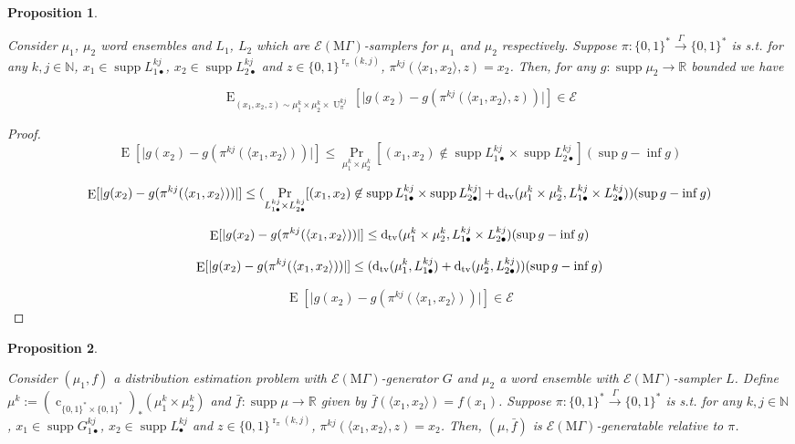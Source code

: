 \documentclass{article}
\numberwithin{equation}{section}
\theoremstyle{definition}
\theoremstyle{plain}
\newtheorem{proposition}{Proposition}[section]
\newcommand{\Bool}{\{0,1\}}
\newcommand{\Words}{{\Bool^*}}
\DeclareMathOperator{\Supp}{supp}
\DeclareMathOperator{\Prb}{Pr}
\DeclareMathOperator{\E}{E}
\DeclareMathOperator{\R}{r}
\DeclareMathOperator{\U}{U}
\DeclareMathOperator{\En}{c}
\newcommand{\Dtv}{\operatorname{d}_{\textnormal{tv}}}
\newcommand{\Nats}{\mathbb{N}}
\newcommand{\Reals}{\mathbb{R}}
\newcommand{\Abs}[1]{\lvert #1 \rvert}
\newcommand{\Chev}[1]{\langle #1 \rangle}
\newcommand{\MGrow}{\mathrm{M}\Gamma}
\newcommand{\Fall}{\mathcal{E}}
\newcommand{\Scheme}{\xrightarrow{\Gamma}}
\begin{document}
\begin{samepage}
\begin{proposition}
\label{prp:tbd}

Consider $\mu_1$, $\mu_2$ word ensembles and $L_1$, $L_2$ which are $\Fall(\MGrow)$-samplers for $\mu_1$ and $\mu_2$ respectively. Suppose $\pi: \Words \Scheme \Words$ is s.t. for any $k,j \in \Nats$, $x_1 \in \Supp L_{1\bullet}^{kj}$, ${x_2 \in \Supp L_{2\bullet}^{kj}}$ and $z \in \Bool^{\R_\pi(k,j)}$, $\pi^{kj}(\Chev{x_1,x_2},z)=x_2$. Then, for any $g: \Supp \mu_2 \rightarrow \Reals$ bounded we have 

$$\E_{(x_1,x_2,z) \sim\mu_1^k \times \mu_2^k \times \U_\pi^{kj}}[\Abs{g(x_2)-g(\pi^{kj}(\Chev{x_1,x_2},z))}] \in \Fall$$

\end{proposition}
\end{samepage}

\begin{proof}

$$\E[\Abs{g(x_2)-g(\pi^{kj}(\Chev{x_1,x_2}))}] \leq \Prb_{ \mu_1^k \times \mu_2^k}[(x_1,x_2) \not\in \Supp L_{1\bullet}^{kj} \times \Supp L_{2\bullet}^{kj}] (\sup g - \inf g)$$

$$\E[\Abs{g(x_2)-g(\pi^{kj}(\Chev{x_1,x_2}))}] \leq (\Prb_{ L_{1\bullet}^{kj} \times L_{2\bullet}^{kj}}[(x_1,x_2) \not\in \Supp L_{1\bullet}^{kj} \times \Supp L_{2\bullet}^{kj}]+\Dtv(\mu_1^k \times \mu_2^k,L_{1\bullet}^{kj} \times L_{2\bullet}^{kj})) (\sup g - \inf g)$$

$$\E[\Abs{g(x_2)-g(\pi^{kj}(\Chev{x_1,x_2}))}] \leq \Dtv(\mu_1^k \times \mu_2^k,L_{1\bullet}^{kj} \times L_{2\bullet}^{kj}) (\sup g - \inf g)$$

$$\E[\Abs{g(x_2)-g(\pi^{kj}(\Chev{x_1,x_2}))}] \leq (\Dtv(\mu_1^k,L_{1\bullet}^{kj})+\Dtv(\mu_2^k,L_{2\bullet}^{kj})) (\sup g - \inf g)$$

$$\E[\Abs{g(x_2)-g(\pi^{kj}(\Chev{x_1,x_2}))}] \in \Fall$$

\end{proof}

\begin{samepage}
\begin{proposition}
\label{prp:tbd}

Consider $(\mu_1, f)$ a distribution estimation problem with $\Fall(\MGrow)$-generator $G$ and $\mu_2$ a word ensemble with $\Fall(\MGrow)$-sampler $L$. Define ${\mu^k:=(\En_{\Words \times \Words})_*(\mu_1^k \times \mu_2^k)}$ and $\bar{f}: \Supp \mu \rightarrow \Reals$ given by $\bar{f}(\Chev{x_1,x_2})=f(x_1)$. Suppose $\pi: \Words \Scheme \Words$ is s.t. for any $k,j \in \Nats$, $x_1 \in \Supp G_{1\bullet}^{kj}$, ${x_2 \in \Supp L_\bullet^{kj}}$ and $z \in \Bool^{\R_\pi(k,j)}$, $\pi^{kj}(\Chev{x_1,x_2},z)=x_2$. Then, $(\mu,\bar{f})$ is $\Fall(\MGrow)$-generatable relative to $\pi$.

\end{proposition}
\end{samepage}
\end{document}
